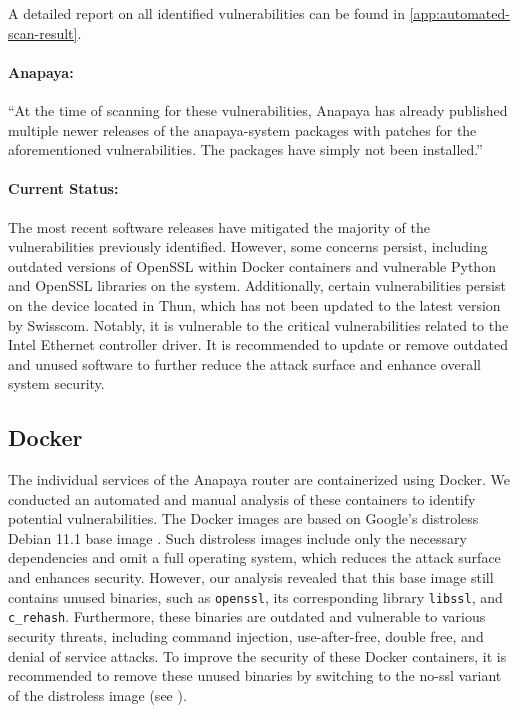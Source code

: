 A detailed report on all identified vulnerabilities can be found in \cref{app:automated-scan-result}.

\begin{boxH}
\paragraph{Anapaya:}
``At the time of scanning for these vulnerabilities, Anapaya has already published multiple newer releases of the anapaya-system packages with patches for the aforementioned vulnerabilities. The packages have simply not been installed.''
\end{boxH}

\paragraph{Current Status:}
The most recent software releases have mitigated the majority of the vulnerabilities previously identified.
However, some concerns persist, including outdated versions of OpenSSL within Docker containers and vulnerable Python and OpenSSL libraries on the system.
Additionally, certain vulnerabilities persist on the device located in Thun, which has not been updated to the latest version by Swisscom.
Notably, it is vulnerable to the critical vulnerabilities related to the Intel Ethernet controller driver.
It is recommended to update or remove outdated and unused software to further reduce the attack surface and enhance overall system security.

\subsection{Docker}
\label{sec:docker}

The individual services of the Anapaya router are containerized using Docker.
We conducted an automated and manual analysis of these containers to identify potential vulnerabilities.
The Docker images are based on Google's distroless Debian 11.1 base image \cite{githubGitHubGoogleContainerToolsdistroless}.
Such distroless images include only the necessary dependencies and omit a full operating system, which reduces the attack surface and enhances security.
However, our analysis revealed that this base image still contains unused binaries, such as \texttt{openssl}, its corresponding library \texttt{libssl}, and \texttt{c\_rehash}.
Furthermore, these binaries are outdated and vulnerable to various security threats, including command injection, use-after-free, double free, and denial of service attacks.
To improve the security of these Docker containers, it is recommended to remove these unused binaries by switching to the no-ssl variant of the distroless image (see \cite{githubGitHubGoogleContainerToolsdistroless}).

